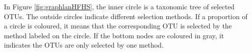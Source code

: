 \documentclass[openany]{book}
\begin{document}
In Figure \ref{fig:graphlanHFHS}, the inner circle is a taxonomic tree
of selected OTUs. The outside circles indicate different selection
methods. If a proportion of a circle is coloured, it means that the
corresponding OTU is selected by the method labeled on the circle. If
the bottom nodes are coloured in gray, it indicates the OTUs are only
selected by one method.


\end{document}
